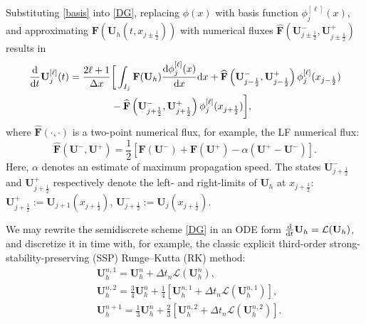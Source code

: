 \documentclass[times,final]{elsarticle}
\numberwithin{equation}{section}
\theoremstyle{definition}
\theoremstyle{remark}
\newcommand{\BU}{\mathbf{U}}
\newcommand{\BF}{\mathbf{F}}
\begin{document}
Substituting \eqref{basis} into \eqref{DG}, replacing $\phi(x)$ with basis function $\phi_j^{[\ell]} (x)$, and approximating $\BF \left(\BU_h (t, x_{j \pm \frac{1}{2}} ) \right)$ with numerical fluxes $\widehat{\BF} \left( \BU^-_{j \pm \frac{1}{2}}, \BU^+_{j \pm \frac{1}{2}} \right) $ results in
\begin{equation*}
	\begin{aligned}\label{DGmethod}
		\frac{\rm d}{{\rm d} t} \BU_j^{[\ell]} (t) 
		=  
		\frac{2 \ell + 1}{\Delta x} 
		& \bigg[ 
		\int_{I_j} \BF (\BU_h) \frac{{\rm d} \phi_j^{[\ell]} (x)}{{\rm d} x} {\rm d} x 
		+ 
		\widehat{\BF} \left( \BU^-_{j - \frac{1}{2}}, \BU^+_{j - \frac{1}{2}} \right) 
		\phi_j^{[\ell]} (x_{j - \frac{1}{2}}) 
		\\
		& - \widehat{\BF} \left( \BU^-_{j + \frac{1}{2}}, \BU^+_{j + \frac{1}{2}} \right) \phi_j^{[\ell]} (x_{j + \frac{1}{2}})
		\bigg],
	\end{aligned}
\end{equation*} 
where $\widehat{\BF} \left( \cdot, \cdot \right) $ is a two-point numerical flux, for example, the LF numerical flux:
\begin{equation*}\label{LF}
	\widehat{\BF} ( \BU^-, \BU^+ ) 
	= 
	\frac12 \left[ \BF ( \BU^- ) + \BF ( \BU^+ ) - \alpha ( \BU^+ - \BU^- ) \right].
\end{equation*}
Here, $\alpha$ denotes an estimate of maximum propagation speed.
The states $\BU^-_{j + \frac{1}{2}}$ and $\BU^+_{j + \frac{1}{2}}$ respectively denote the left- and right-limits of $\BU_h$ at $x_{j+\frac12}$:
$\BU^{+}_{j + \frac{1}{2}} := \BU_{j+1}(x_{j+\frac12})$, $\BU^{-}_{j + \frac{1}{2}}:=\BU_{j}(x_{j+\frac12})$.

We may rewrite the semidiscrete scheme \eqref{DG} in an ODE form $\frac{\rm d}{{\rm d} t} \BU_h = \mathcal{L} (\BU_h)$, and discretize it in time with, for example, the classic explicit third-order strong-stability-preserving (SSP)  Runge--Kutta (RK) method:
\begin{equation}
	\label{RK}
	\begin{aligned}
		&\BU_h^{n, 1} = \BU_h^{n} + \Delta t_n \mathcal{L} \left(\BU_h^{n} \right), \\
		&\BU_h^{n, 2} = \frac{3}{4} \BU_h^{n} + \frac{1}{4} \left[ \BU_h^{n, 1} + \Delta t_n \mathcal{L} \left(\BU_h^{n, 1} \right) \right], \\
		&\BU_h^{n + 1} = \frac{1}{3} \BU_h^{n} + \frac{2}{3} \left[ \BU_h^{n, 2} + \Delta t_n \mathcal{L} \left(\BU_h^{n, 2} \right) \right].
	\end{aligned}
\end{equation}
\end{document}
